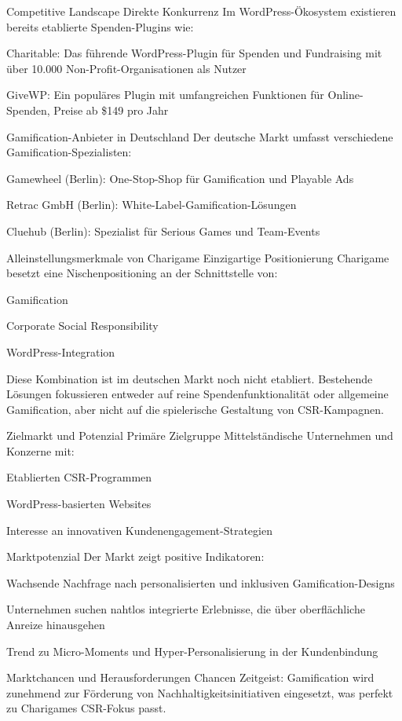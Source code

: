 Competitive Landscape
Direkte Konkurrenz
Im WordPress-Ökosystem existieren bereits etablierte Spenden-Plugins wie:

Charitable: Das führende WordPress-Plugin für Spenden und Fundraising mit über 10.000 Non-Profit-Organisationen als Nutzer

GiveWP: Ein populäres Plugin mit umfangreichen Funktionen für Online-Spenden, Preise ab \$149 pro Jahr

Gamification-Anbieter in Deutschland
Der deutsche Markt umfasst verschiedene Gamification-Spezialisten:

Gamewheel (Berlin): One-Stop-Shop für Gamification und Playable Ads

Retrac GmbH (Berlin): White-Label-Gamification-Lösungen

Cluehub (Berlin): Spezialist für Serious Games und Team-Events

Alleinstellungsmerkmale von Charigame
Einzigartige Positionierung
Charigame besetzt eine Nischenpositioning an der Schnittstelle von:

Gamification

Corporate Social Responsibility

WordPress-Integration

Diese Kombination ist im deutschen Markt noch nicht etabliert. Bestehende Lösungen fokussieren entweder auf reine Spendenfunktionalität oder allgemeine Gamification, aber nicht auf die spielerische Gestaltung von CSR-Kampagnen.

Zielmarkt und Potenzial
Primäre Zielgruppe
Mittelständische Unternehmen und Konzerne mit:

Etablierten CSR-Programmen

WordPress-basierten Websites

Interesse an innovativen Kundenengagement-Strategien

Marktpotenzial
Der Markt zeigt positive Indikatoren:

Wachsende Nachfrage nach personalisierten und inklusiven Gamification-Designs

Unternehmen suchen nahtlos integrierte Erlebnisse, die über oberflächliche Anreize hinausgehen

Trend zu Micro-Moments und Hyper-Personalisierung in der Kundenbindung

Marktchancen und Herausforderungen
Chancen
Zeitgeist: Gamification wird zunehmend zur Förderung von Nachhaltigkeitsinitiativen eingesetzt, was perfekt zu Charigames CSR-Fokus passt.

